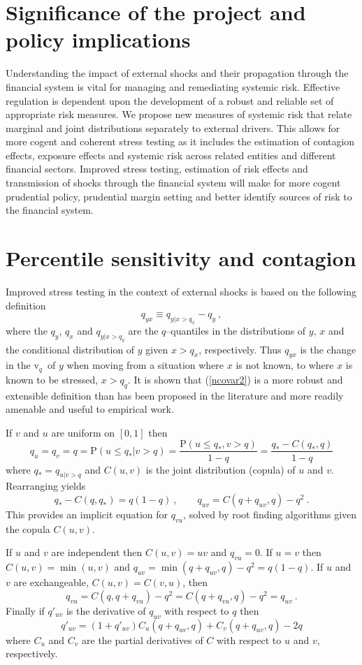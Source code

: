 \documentclass[authoryear]{elsarticle}
\newcommand{\be}{\begin{equation}}
\newcommand{\ee}{\end{equation}}
\renewcommand{\v}{\ensuremath{\mathrm{v}_q}}
\newcommand{\eref}[1]{(\ref{#1})}
\newcommand{\cq}{\ , \qquad}
\renewcommand{\P}{\mathrm{P}}
\begin{document}
\section{Significance of the project and  policy implications}

Understanding the impact of external shocks and their propagation through   the financial system is vital for managing and remediating systemic risk. Effective regulation is dependent upon the development of a robust and reliable set of appropriate risk measures.  We propose new measures of systemic risk that relate marginal and joint distributions separately to external drivers. This allows for more cogent and coherent stress testing as it includes the estimation of contagion effects, exposure effects and systemic risk across related entities and different financial sectors. Improved stress testing, estimation of risk effects and transmission of shocks through the financial system will make for more cogent prudential policy, prudential margin setting and better identify sources of risk to the financial system.

\section{Percentile sensitivity and contagion}\label{perc}

Improved stress testing in the context of  external shocks is based on the following definition
\be\label{ncovar2}
q_{yx} \equiv q_{y|x>q_x} - q_y\ ,
\ee 
where the $q_y$, $q_x$ and $q_{y|x>q_q}$ are the $q$--quantiles in the distributions of $y$, $x$ and the conditional distribution of $y$ given $x>q_x$, respectively.
Thus  $q_{yx}$ is the change in the \v\ of $y$ when moving from a situation where $x$ is not known, to where  $x$ is known to be stressed, $x>q_q$. 
It is shown  that \eref{ncovar2} is a more robust and extensible definition than has been proposed in the literature  and more readily amenable and useful to empirical work. 

If $v$ and $u$ are uniform on $[0,1]$ then  
\be\label{Qdef}
q_u=q_v= q=\P(u\le q_*|v>q) =  \frac{\P(u\le q_*,v>q)}{1-q}  = \frac{q_*-C(q_*,q)}{1-q}
\ee
where $q_*=q_{u|v>q}$ and $C(u,v)$ is the joint distribution (copula) of $u$ and $v$.
Rearranging yields
\be\label{uplus}
q_* -C(q,q_*)= q(1-q)\cq q_{uv}=C(q+q_{uv},q)-q^2\ .
\ee
This provides an implicit equation for $q_{vu}$, solved by  root finding algorithms given the copula $C(u,v)$.

If $u$ and $v$ are independent then $C(u,v)=uv$ and  $q_{vu}=0$.   If $u=v$ then $C(u,v)=\min(u,v)$ and  $q_{uv}
=\min(q+q_{uv},q)-q^2=q(1-q)$.  If $u$ and $v$ are exchangeable, $C(u,v)=C(v,u)$, then 
$$
q_{vu} = C(q,q+q_{vu})-q^2=C(q+q_{vu},q)-q^2=q_{uv}\ .
$$
Finally  if $q'_{uv}$ is the derivative of $q_{uv}$ with respect to $q$ then
$$
q'_{uv}= (1+q'_{uv})C_u(q+q_{uv},q)+C_v(q+q_{uv},q)-2q
$$
where $C_u$ and $C_v$ are the partial derivatives of $C$ with respect to $u$ and $v$, respectively.
\end{document}
